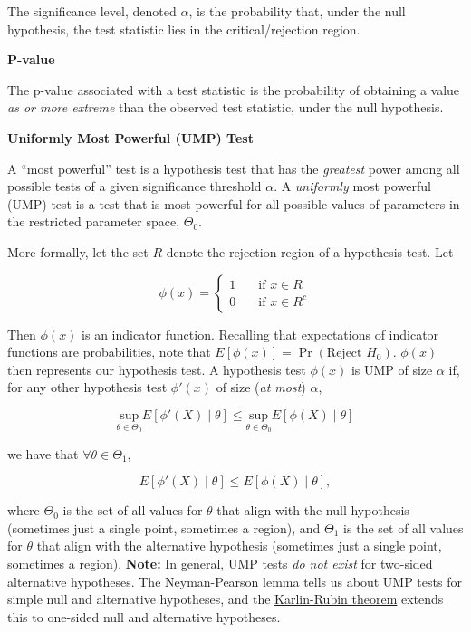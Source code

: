 \documentclass[
  letterpaper,
  DIV=11,
  numbers=noendperiod]{scrreprt}
\begin{document}
The significance level, denoted \(\alpha\), is the probability that,
under the null hypothesis, the test statistic lies in the
critical/rejection region.

\textbf{P-value}

The p-value associated with a test statistic is the probability of
obtaining a value \emph{as or more extreme} than the observed test
statistic, under the null hypothesis.

\textbf{Uniformly Most Powerful (UMP) Test}

A ``most powerful'' test is a hypothesis test that has the
\emph{greatest} power among all possible tests of a given significance
threshold \(\alpha\). A \emph{uniformly} most powerful (UMP) test is a
test that is most powerful for all possible values of parameters in the
restricted parameter space, \(\Theta_0\).

More formally, let the set \(R\) denote the rejection region of a
hypothesis test. Let

\[
\phi(x) = \begin{cases} 1 & \quad \text{if } x \in R \\ 0 & \quad \text{if } x \in R^c \end{cases}
\]

Then \(\phi(x)\) is an indicator function. Recalling that expectations
of indicator functions are probabilities, note that
\(E[\phi(x)] = \Pr(\text{Reject } H_0)\). \(\phi(x)\) then represents
our hypothesis test. A hypothesis test \(\phi(x)\) is UMP of size
\(\alpha\) if, for any other hypothesis test \(\phi'(x)\) of size
(\emph{at most}) \(\alpha\),

\[
\underset{\theta \in \Theta_0}{\text{sup}} E[\phi'(X) \mid \theta] \leq \underset{\theta \in \Theta_0}{\text{sup}} E[\phi(X) \mid \theta]
\]

we have that \(\forall \theta \in \Theta_1\),

\[
E[\phi'(X) \mid \theta] \leq E[\phi(X) \mid \theta],
\]

where \(\Theta_0\) is the set of all values for \(\theta\) that align
with the null hypothesis (sometimes just a single point, sometimes a
region), and \(\Theta_1\) is the set of all values for \(\theta\) that
align with the alternative hypothesis (sometimes just a single point,
sometimes a region). \textbf{Note:} In general, UMP tests \emph{do not
exist} for two-sided alternative hypotheses. The Neyman-Pearson lemma
tells us about UMP tests for simple null and alternative hypotheses, and
the
\href{https://en.wikipedia.org/wiki/Uniformly_most_powerful_test}{Karlin-Rubin
theorem} extends this to one-sided null and alternative hypotheses.
\end{document}
